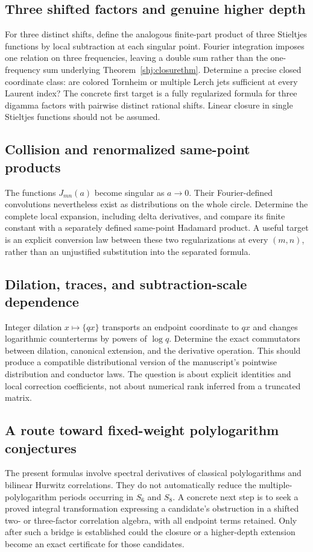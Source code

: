 \subsection{Three shifted factors and genuine higher depth}
For three distinct shifts, define the analogous finite-part product of three Stieltjes functions by local subtraction at each singular point. Fourier integration imposes one relation on three frequencies, leaving a double sum rather than the one-frequency sum underlying Theorem~\ref{shj:closurethm}. Determine a precise closed coordinate class: are colored Tornheim or multiple Lerch jets sufficient at every Laurent index? The concrete first target is a fully regularized formula for three digamma factors with pairwise distinct rational shifts. Linear closure in single Stieltjes functions should not be assumed.

\subsection{Collision and renormalized same-point products}
The functions $J_{mn}(a)$ become singular as $a\to0$. Their Fourier-defined convolutions nevertheless exist as distributions on the whole circle. Determine the complete local expansion, including delta derivatives, and compare its finite constant with a separately defined same-point Hadamard product. A useful target is an explicit conversion law between these two regularizations at every $(m,n)$, rather than an unjustified substitution into the separated formula.

\subsection{Dilation, traces, and subtraction-scale dependence}
Integer dilation $x\mapsto\{qx\}$ transports an endpoint coordinate to $qx$ and changes logarithmic counterterms by powers of $\log q$. Determine the exact commutators between dilation, canonical extension, and the derivative operation. This should produce a compatible distributional version of the manuscript's pointwise distribution and conductor laws. The question is about explicit identities and local correction coefficients, not about numerical rank inferred from a truncated matrix.

\subsection{A route toward fixed-weight polylogarithm conjectures}
The present formulas involve spectral derivatives of classical polylogarithms and bilinear Hurwitz correlations. They do not automatically reduce the multiple-polylogarithm periods occurring in $S_6$ and $S_8$. A concrete next step is to seek a proved integral transformation expressing a candidate's obstruction in a shifted two- or three-factor correlation algebra, with all endpoint terms retained. Only after such a bridge is established could the closure or a higher-depth extension become an exact certificate for those candidates.

